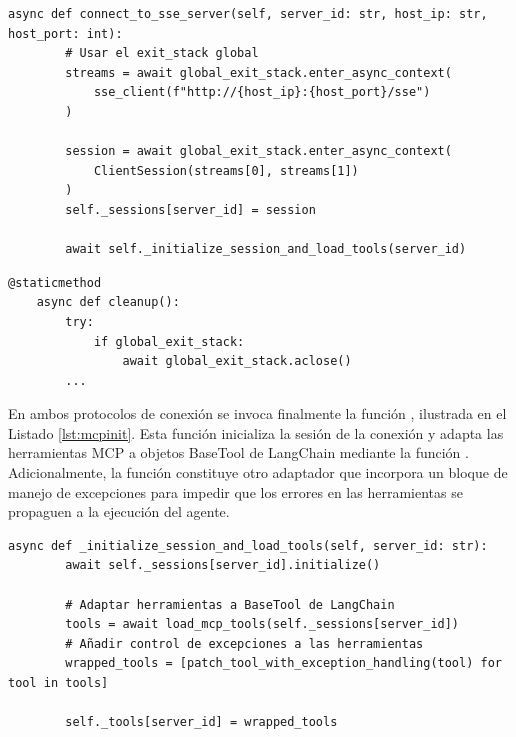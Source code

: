 \begin{lstlisting}[caption={\protect\opus{mcp_multi_client.py}: función \protect\opus{connect_to_sse_server} en el cliente MCP},label={lst:mcpsse}]
    async def connect_to_sse_server(self, server_id: str, host_ip: str, host_port: int):
        # Usar el exit_stack global
        streams = await global_exit_stack.enter_async_context(
            sse_client(f"http://{host_ip}:{host_port}/sse")
        )

        session = await global_exit_stack.enter_async_context(
            ClientSession(streams[0], streams[1])
        )
        self._sessions[server_id] = session

        await self._initialize_session_and_load_tools(server_id)
\end{lstlisting}

\begin{lstlisting}[caption={\protect\opus{mcp_multi_client.py}: función \protect\opus{cleanup()} en el cliente MCP},label={lst:clean}]
    @staticmethod
    async def cleanup():
        try:
            if global_exit_stack:
                await global_exit_stack.aclose()
        ...

\end{lstlisting}


En ambos protocolos de conexión se invoca finalmente la función , ilustrada en el Listado \ref{lst:mcpinit}. Esta función inicializa la sesión de la conexión y adapta las herramientas MCP a objetos BaseTool de LangChain mediante la función . Adicionalmente, la función  constituye otro adaptador que incorpora un bloque de manejo de excepciones para impedir que los errores en las herramientas se propaguen a la ejecución del agente.

\begin{lstlisting}[caption={\protect\opus{mcp_multi_client.py}: función \protect\opus{_initialize_session_and_load_tools} en el cliente MCP},label={lst:mcpinit}]
    async def _initialize_session_and_load_tools(self, server_id: str):
        await self._sessions[server_id].initialize()

        # Adaptar herramientas a BaseTool de LangChain
        tools = await load_mcp_tools(self._sessions[server_id])
        # Añadir control de excepciones a las herramientas
        wrapped_tools = [patch_tool_with_exception_handling(tool) for tool in tools]

        self._tools[server_id] = wrapped_tools
\end{lstlisting}






